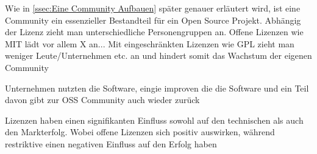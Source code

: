 Wie in \ref{ssec:Eine Community Aufbauen} später genauer erläutert wird, ist eine Community ein 
essenzieller Bestandteil für ein Open Source Projekt.
Abhängig der Lizenz zieht man unterschiedliche Personengruppen an.
Offene Lizenzen wie MIT lädt vor allem X an...
Mit eingeschränkten Lizenzen wie GPL zieht man weniger Leute/Unternehmen etc. an und hindert 
somit das Wachstum der eigenen Community 

Unternehmen nutzten die Software, 
eingie improven die die Software und ein Teil davon gibt zur OSS Community auch wieder zurück 
\cite{bangerthWhatMakesComputational2013} %

\bigskip

\begin{hypothesis}
    Lizenzen haben einen signifikanten Einfluss sowohl auf den technischen
    als auch den Markterfolg. 
    Wobei offene Lizenzen sich positiv auswirken, während restriktive einen negativen
    Einfluss auf den Erfolg haben
\end{hypothesis}
